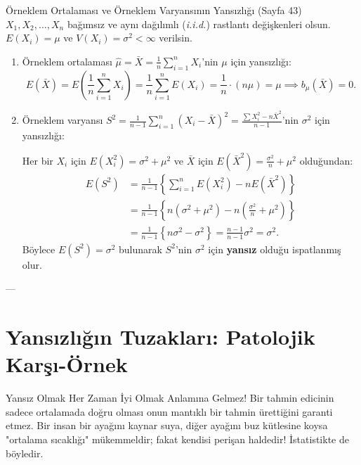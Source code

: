 \documentclass[11pt,a4paper]{article}
\begin{document}
\begin{ornek}{Örneklem Ortalaması ve Örneklem Varyansının Yansızlığı (Sayfa 43)}
$X_1, X_2, \dots, X_n$ bağımsız ve aynı dağılımlı (\textit{i.i.d.}) rastlantı değişkenleri olsun. $E(X_i) = \mu$ ve $V(X_i) = \sigma^2 < \infty$ verilsin.
\begin{enumerate}
    \item Örneklem ortalaması $\hat{\mu} = \bar{X} = \frac{1}{n}\sum_{i=1}^n X_i$'nin $\mu$ için yansızlığı:
    \[
    E(\bar{X}) = E\left( \frac{1}{n} \sum_{i=1}^n X_i \right) = \frac{1}{n} \sum_{i=1}^n E(X_i) = \frac{1}{n} \cdot (n\mu) = \mu \implies b_\mu(\bar{X}) = 0.
    \]
    \item Örneklem varyansı $S^2 = \frac{1}{n-1} \sum_{i=1}^n (X_i - \bar{X})^2 = \frac{\sum X_i^2 - n\bar{X}^2}{n-1}$'nin $\sigma^2$ için yansızlığı:
    
    Her bir $X_i$ için $E(X_i^2) = \sigma^2 + \mu^2$ ve $\bar{X}$ için $E(\bar{X}^2) = \frac{\sigma^2}{n} + \mu^2$ olduğundan:
    \begin{align*}
    E(S^2) &= \frac{1}{n-1} \left\{ \sum_{i=1}^n E(X_i^2) - n E(\bar{X}^2) \right\} \\
    &= \frac{1}{n-1} \left\{ n(\sigma^2 + \mu^2) - n \left( \frac{\sigma^2}{n} + \mu^2 \right) \right\} \\
    &= \frac{1}{n-1} \left\{ n\sigma^2 - \sigma^2 \right\} = \frac{n-1}{n-1}\sigma^2 = \sigma^2.
    \end{align*}
    Böylece $E(S^2) = \sigma^2$ bulunarak $S^2$'nin $\sigma^2$ için \textbf{yansız} olduğu ispatlanmış olur.
\end{enumerate}
\end{ornek}

---

\section{Yansızlığın Tuzakları: Patolojik Karşı-Örnek}

\begin{sezgi}{Yansız Olmak Her Zaman İyi Olmak Anlamına Gelmez!}
Bir tahmin edicinin sadece ortalamada doğru olması onun mantıklı bir tahmin ürettiğini garanti etmez. Bir insan bir ayağını kaynar suya, diğer ayağını buz kütlesine koysa "ortalama sıcaklığı" mükemmeldir; fakat kendisi perişan haldedir! İstatistikte de böyledir.
\end{sezgi}
\end{document}
